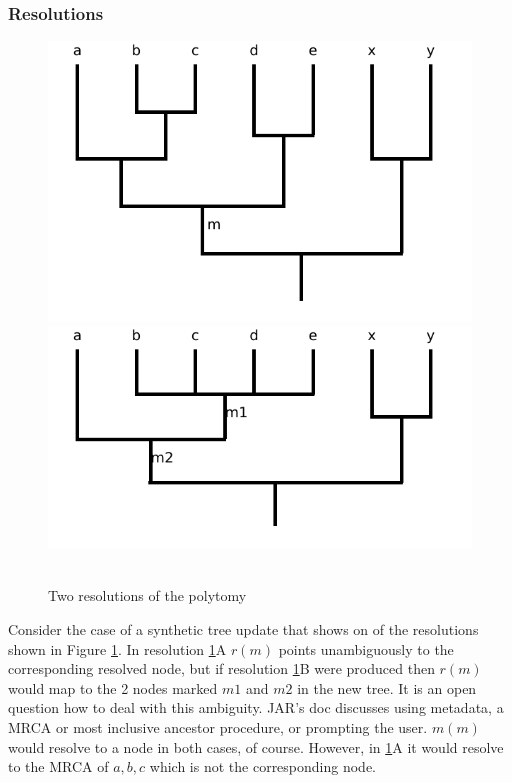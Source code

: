 \documentclass[11pt]{article}
\begin{document}
\subsubsection{Resolutions}
\begin{figure}[h!]
   \centering  \includegraphics[scale=.5]{images/jar-unique-resolution.pdf}
   \includegraphics[scale=.5]{images/jar-ambiguous-resolution.pdf}\\
   \\
   \caption{Two resolutions of the polytomy}\label{jarResolution1}
\end{figure}
Consider the case of a synthetic tree update that shows on of the resolutions
shown in Figure \ref{jarResolution1}.
In resolution \ref{jarResolution1}A $r(m)$ points unambiguously to the corresponding
  resolved node, but if resolution \ref{jarResolution1}B were produced
  then $r(m)$ would map to the 2 nodes marked $m1$ and $m2$
  in the new tree.
It is an open question how to deal with this ambiguity.
JAR's doc discusses using metadata, a MRCA or most inclusive ancestor procedure, or prompting the user.
$m(m)$ would resolve to a node in both cases, of course.
However, in \ref{jarResolution1}A it would resolve to the MRCA of $a,b,c$ which is not the corresponding
  node.
\end{document}
